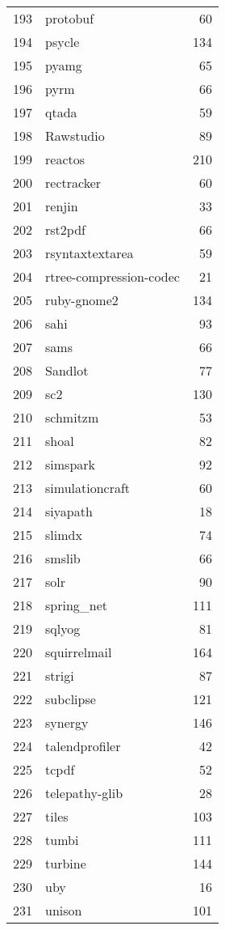 \begin{table}[!ht]
\begin{tabular}{rlr}
  193 & protobuf &  60 \\ 
  194 & psycle & 134 \\ 
  195 & pyamg &  65 \\ 
  196 & pyrm &  66 \\ 
  197 & qtada &  59 \\ 
  198 & Rawstudio &  89 \\ 
  199 & reactos & 210 \\ 
  200 & rectracker &  60 \\ 
  201 & renjin &  33 \\ 
  202 & rst2pdf &  66 \\ 
  203 & rsyntaxtextarea &  59 \\ 
  204 & rtree-compression-codec &  21 \\ 
  205 & ruby-gnome2 & 134 \\ 
  206 & sahi &  93 \\ 
  207 & sams &  66 \\ 
  208 & Sandlot &  77 \\ 
  209 & sc2 & 130 \\ 
  210 & schmitzm &  53 \\ 
  211 & shoal &  82 \\ 
  212 & simspark &  92 \\ 
  213 & simulationcraft &  60 \\ 
  214 & siyapath &  18 \\ 
  215 & slimdx &  74 \\ 
  216 & smslib &  66 \\ 
  217 & solr &  90 \\ 
  218 & spring\_net & 111 \\ 
  219 & sqlyog &  81 \\ 
  220 & squirrelmail & 164 \\ 
  221 & strigi &  87 \\ 
  222 & subclipse & 121 \\ 
  223 & synergy & 146 \\ 
  224 & talendprofiler &  42 \\ 
  225 & tcpdf &  52 \\ 
  226 & telepathy-glib &  28 \\ 
  227 & tiles & 103 \\ 
  228 & tumbi & 111 \\ 
  229 & turbine & 144 \\ 
  230 & uby &  16 \\ 
  231 & unison & 101 \\ 

\end{tabular}
\end{table}

